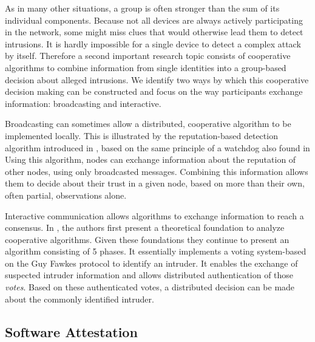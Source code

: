 \documentclass[conference]{IEEEtran}
\begin{document}
As in many other situations, a group is often stronger than the sum of its
individual components. Because not all devices are always actively
participating in the network, some might miss clues that would otherwise lead
them to detect intrusions. It is hardly impossible for a single device to
detect a complex attack by itself. Therefore a second important research topic
consists of cooperative algorithms to combine information from single
identities into a group-based decision about alleged
intrusions\cite{zhang2000intrusion}. We identify two ways by which this
cooperative decision making can be constructed and focus on the way
participants exchange information: broadcasting and interactive.

\begin{LaTeXdescription}

  \item[Broadcasting] can sometimes allow a distributed, cooperative algorithm
  to be implemented locally. This is illustrated by the reputation-based
  detection algorithm introduced in \cite{ganeriwal2008reputation}, based on
  the same principle of a watchdog also found in \cite{mishra2004intrusion}
  Using this algorithm, nodes can exchange information about the reputation of
  other nodes, using only broadcasted messages. Combining this information
  allows them to decide about their trust in a given node, based on more than
  their own, often partial, observations alone.

  \item[Interactive] communication allows algorithms to exchange information to
  reach a consensus. In \cite{krontiris2009cooperative}, the authors first
  present a theoretical foundation to analyze cooperative algorithms. Given
  these foundations they continue to present an algorithm consisting of 5
  phases. It essentially implements a voting system-based on the Guy Fawkes
  protocol\cite{anderson1998new} to identify an intruder. It enables the
  exchange of suspected intruder information and allows distributed
  authentication of those \emph{votes}. Based on these authenticated votes, a
  distributed decision can be made about the commonly identified intruder.

\end{LaTeXdescription}

\subsection{Software Attestation}
\label{subsection:attestation}
\end{document}
